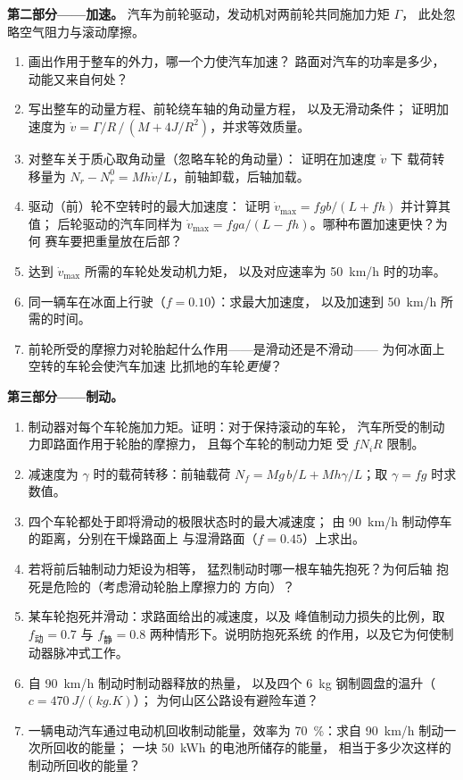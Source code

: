 \begin{problem}
\medskip
\noindent\textbf{第二部分——加速。}
汽车为前轮驱动，发动机对两前轮共同施加力矩 $\Gamma$，
此处忽略空气阻力与滚动摩擦。
\begin{enumerate}[resume]
  \item 画出作用于整车的外力，哪一个力使汽车加速？
        路面对汽车的功率是多少，
        动能又来自何处？
  \item 写出整车的动量方程、前轮绕车轴的角动量方程，
        以及无滑动条件；
        证明加速度为 $\dot v =
        \Gamma/R\,/\,(M + 4J/R^2)$，并求等效质量。
  \item 对整车关于质心取角动量（忽略车轮的角动量）：
        证明在加速度 $\dot v$ 下
        载荷转移量为 $N_r - N_r^0 =
        Mh\dot v/L$，前轴卸载，后轴加载。
  \item 驱动（前）轮不空转时的最大加速度：
        证明 $\dot v_{\max} = fgb/(L + fh)$ 并计算其值；
        后轮驱动的汽车同样为 $\dot v_{\max} =
        fga/(L - fh)$。哪种布置加速更快？为何
        赛车要把重量放在后部？
  \item 达到 $\dot v_{\max}$ 所需的车轮处发动机力矩，
        以及对应速率为 \qty{50}{km/h} 时的功率。
  \item 同一辆车在冰面上行驶（$f = 0.10$）：求最大加速度，
        以及加速到 \qty{50}{km/h} 所需的时间。
  \item 前轮所受的摩擦力对轮胎起什么作用——是滑动还是不滑动——
        为何冰面上空转的车轮会使汽车加速
        比抓地的车轮\emph{更慢}？
\end{enumerate}

\medskip
\noindent\textbf{第三部分——制动。}
\begin{enumerate}[resume]
  \item 制动器对每个车轮施加力矩。证明：对于保持滚动的车轮，
        汽车所受的制动力即路面作用于轮胎的摩擦力，
        且每个车轮的制动力矩
        受 $fN_iR$ 限制。
  \item 减速度为 $\gamma$ 时的载荷转移：前轴载荷
        $N_f = Mg\,b/L + Mh\gamma/L$；取 $\gamma = fg$ 时求数值。
  \item 四个车轮都处于即将滑动的极限状态时的最大减速度；
        由 \qty{90}{km/h} 制动停车的距离，分别在干燥路面上
        与湿滑路面（$f = 0.45$）上求出。
  \item 若将前后轴制动力矩设为相等，
        猛烈制动时哪一根车轴先抱死？为何后轴
        抱死是危险的（考虑滑动轮胎上摩擦力的
        方向）？
  \item 某车轮抱死并滑动：求路面给出的减速度，以及
        峰值制动力损失的比例，取 $f_{\text{动}} =
        0.7$ 与 $f_{\text{静}} = 0.8$ 两种情形下。说明防抱死系统
        的作用，以及它为何使制动器脉冲式工作。
  \item 自 \qty{90}{km/h} 制动时制动器释放的热量，
        以及四个 \qty{6}{kg} 钢制圆盘的温升（$c = \qty{470}{J/(kg.K)}$）；
        为何山区公路设有避险车道？
  \item 一辆电动汽车通过电动机回收制动能量，效率为
        \qty{70}{\%}：求自 \qty{90}{km/h} 制动一次所回收的能量；
        一块 \qty{50}{kWh} 的电池所储存的能量，
        相当于多少次这样的制动所回收的能量？
\end{enumerate}


\end{problem}
